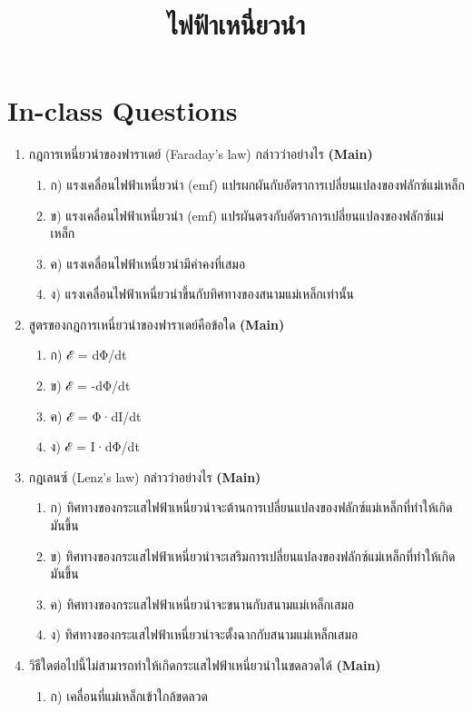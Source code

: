 \documentclass[12pt]{article}
\begin{document}
\title{ไฟฟ้าเหนี่ยวนำ}
\maketitle
\section*{In-class Questions}
\begin{enumerate}[label=\arabic*.]
\item กฎการเหนี่ยวนำของฟาราเดย์ (Faraday's law) กล่าวว่าอย่างไร \hfill \textbf{\small (Main)}
\begin{enumerate}[label=)]
\item ก) แรงเคลื่อนไฟฟ้าเหนี่ยวนำ (emf) แปรผกผันกับอัตราการเปลี่ยนแปลงของฟลักซ์แม่เหล็ก
\item ข) แรงเคลื่อนไฟฟ้าเหนี่ยวนำ (emf) แปรผันตรงกับอัตราการเปลี่ยนแปลงของฟลักซ์แม่เหล็ก
\item ค) แรงเคลื่อนไฟฟ้าเหนี่ยวนำมีค่าคงที่เสมอ
\item ง) แรงเคลื่อนไฟฟ้าเหนี่ยวนำขึ้นกับทิศทางของสนามแม่เหล็กเท่านั้น
\end{enumerate}
\item สูตรของกฎการเหนี่ยวนำของฟาราเดย์คือข้อใด \hfill \textbf{\small (Main)}
\begin{enumerate}[label=)]
\item ก) ℰ = dΦ/dt
\item ข) ℰ = -dΦ/dt
\item ค) ℰ = Φ·dI/dt
\item ง) ℰ = I·dΦ/dt
\end{enumerate}
\item กฎเลนซ์ (Lenz's law) กล่าวว่าอย่างไร \hfill \textbf{\small (Main)}
\begin{enumerate}[label=)]
\item ก) ทิศทางของกระแสไฟฟ้าเหนี่ยวนำจะต้านการเปลี่ยนแปลงของฟลักซ์แม่เหล็กที่ทำให้เกิดมันขึ้น
\item ข) ทิศทางของกระแสไฟฟ้าเหนี่ยวนำจะเสริมการเปลี่ยนแปลงของฟลักซ์แม่เหล็กที่ทำให้เกิดมันขึ้น
\item ค) ทิศทางของกระแสไฟฟ้าเหนี่ยวนำจะขนานกับสนามแม่เหล็กเสมอ
\item ง) ทิศทางของกระแสไฟฟ้าเหนี่ยวนำจะตั้งฉากกับสนามแม่เหล็กเสมอ
\end{enumerate}
\item วิธีใดต่อไปนี้ไม่สามารถทำให้เกิดกระแสไฟฟ้าเหนี่ยวนำในขดลวดได้ \hfill \textbf{\small (Main)}
\begin{enumerate}[label=)]
\item ก) เคลื่อนที่แม่เหล็กเข้าใกล้ขดลวด

\end{enumerate}
\end{enumerate}
\end{document}

